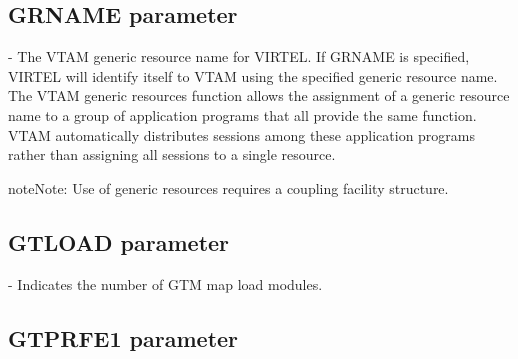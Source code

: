 \documentclass[letterpaper,10pt,english]{sphinxmanual}
\begin{document}
\subsection{GRNAME parameter}
\label{\detokenize{Installation_Guide:grname-parameter}}\label{\detokenize{Installation_Guide:index-69}}
\begin{sphinxVerbatim}[commandchars=\\\{\}]
            
\end{sphinxVerbatim}

 - The VTAM generic resource name for VIRTEL. If GRNAME is specified, VIRTEL will identify itself to VTAM using the specified generic resource name. The VTAM generic resources function allows the assignment of a generic resource name to a group of application programs that all provide the same function. VTAM automatically distributes sessions among these application programs rather than assigning all sessions to a single resource.

\begin{sphinxadmonition}{note}{Note:}
Use of generic resources requires a coupling facility structure.
\end{sphinxadmonition}

\ignorespaces 

\subsection{GTLOAD parameter}
\label{\detokenize{Installation_Guide:gtload-parameter}}\label{\detokenize{Installation_Guide:index-70}}
\begin{sphinxVerbatim}[commandchars=\\\{\}]
                
\end{sphinxVerbatim}

 - Indicates the number of GTM map load modules.

\ignorespaces 

\subsection{GTPRFE1 parameter}
\label{\detokenize{Installation_Guide:gtprfe1-parameter}}\label{\detokenize{Installation_Guide:index-71}}
\begin{sphinxVerbatim}[commandchars=\\\{\}]
    
\end{sphinxVerbatim}
\end{document}

